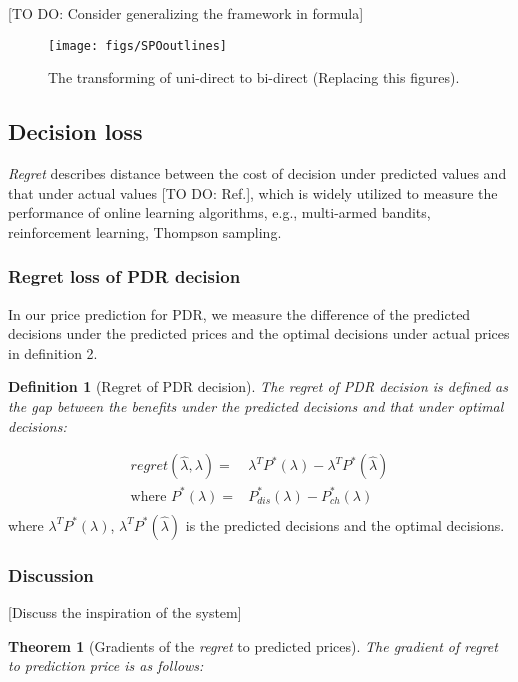 \documentclass[journal]{IEEEtran}
\newtheorem{theorem}{Theorem}
\newtheorem{definition}{Definition}
\begin{document}
[TO DO: Consider generalizing the framework in formula]

\begin{figure}[ht]
  \centering
  \texttt{[image: figs/SPOoutlines]}
  \caption{The transforming of uni-direct to bi-direct (Replacing this figures).}
  \label{SPO}
\end{figure}

\subsection{Decision loss}
\textit{Regret} describes distance between the cost of decision under predicted values and that under actual values [TO DO: Ref.], which is widely utilized to measure the performance of online learning algorithms, e.g., multi-armed bandits, reinforcement learning, Thompson sampling.

\subsubsection{Regret loss of PDR decision}
In our price prediction for PDR, we measure the difference of the predicted decisions under the predicted prices and the optimal decisions under actual prices in definition 2.
\begin{definition}[Regret of PDR decision]
The regret of PDR decision is defined as the gap between the benefits under the predicted decisions and that under optimal decisions:  
\end{definition}
\begin{equation}
  \label{RegretPDR}
  \begin{aligned}
    regret(\hat{\lambda}, \lambda) = & \lambda^T P^*(\lambda) - \lambda^T P^*(\hat{\lambda}) \\
    \text{where } P^*(\lambda) = & P_{dis}^*(\lambda) - P_{ch}^*(\lambda)  \\
  \end{aligned}
\end{equation}
where $\lambda^T P^*(\lambda)$, $\lambda^T P^*(\hat{\lambda})$ is the predicted decisions and the optimal decisions.

\subsubsection{Discussion} [Discuss the inspiration of the system]



\begin{theorem}[Gradients of the \textit{regret} to predicted prices]
  The gradient of regret to prediction price is as follows:
\end{theorem}
\end{document}

